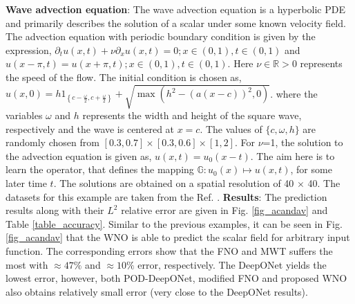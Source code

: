 \documentclass{article}
\begin{document}
\textbf{Wave advection equation}: The wave advection equation is a hyperbolic PDE and primarily describes the solution of a scalar under some known velocity field. The advection equation with periodic boundary condition is given by the expression, $\partial_t u(x,t) + \nu \partial_x u(x,t) = 0; x \in (0,1), t\in (0,1)$ and $u(x - \pi, t) = u(x+\pi, t); x \in (0,1), t \in (0,1)$.
Here $\nu \in \mathbb{R} > 0$ represents the speed of the flow. The initial condition is chosen as, $u(x,0) = h1_{ \left\{c- \frac{\omega}{2}, c+\frac{\omega}{2} \right\} } + \sqrt{ \max(h^2 - (a(x-c))^2,0) }$.
where the variables $\omega$ and $h$ represents the width and height of the square wave, respectively and the wave is centered at $x = c$. The values of $\{c, \omega, h\}$ are randomly chosen from $[0.3, 0.7] \times [0.3, 0.6] \times [1, 2]$. For $\nu$=1, the solution to the advection equation is given as, $u(x,t)=u_0(x-t)$. The aim here is to learn the operator, that defines the mapping $\mathbb{G}: u_0(x) \mapsto u(x,t)$, for some later time $t$. The solutions are obtained on a spatial resolution of 40 $\times$ 40. The datasets for this example are taken from the Ref. \cite{lu2022comprehensive}. 
\textbf{Results}: The prediction results along with their $L^2$ relative error are given in Fig. \ref{fig_acandav} and Table \ref{table_accuracy}. Similar to the previous examples, it can be seen in Fig. \ref{fig_acandav} that the WNO is able to predict the scalar field for arbitrary input function. The corresponding errors show that the FNO and MWT suffers the most with $\approx47\%$ and $\approx 10\%$ error, respectively. The DeepONet yields the lowest error, however, both POD-DeepONet, modified FNO and proposed WNO also obtains relatively small error (very close to the DeepONet results).
\end{document}

